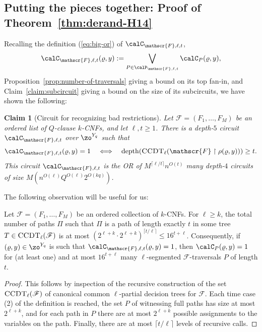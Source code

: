\documentclass[11pt]{article}
\numberwithin{equation}{section}
\newtheorem{claim}[theorem]{Claim}
\theoremstyle{definition}
\theoremstyle{plain}
\theoremstyle{plain}
\newcommand{\uhr}{\upharpoonright}
\newcommand{\CCDT}{\textsc{CCDT}}
\newcommand{\depth}{\mathrm{depth}}
\begin{document}
\subsection{Putting the pieces together: Proof of Theorem~\ref{thm:derand-H14}}

Recalling the definition (\ref{eq:big-or}) of $\calC_{\mathscr{F},\ell,t}$, 
\[ \calC_{\mathscr{F},\ell,t}(\varrho,y) := \bigvee_{P\in\calP_{\mathscr{F},\ell,t}} \calC_P(\varrho,y), \] 
Proposition~\ref{prop:number-of-traversals} giving a bound on its top fan-in, and Claim~\ref{claim:subcircuit} giving a bound on the size of its subcircuits, we have shown the following: 

\begin{claim}[Circuit for recognizing bad restrictions]
\label{claim:overall-ckt}  
Let $\mathscr{F} = (F_1,\ldots,F_M)$ be an ordered list of $Q$-clause $k$-CNFs, and let $\ell,t\ge 1$.  There is a depth-$5$ circuit $\calC_{\mathscr{F},\ell,t}$ over $\zo^{Y_q}$ such that 
\[ \calC_{\mathscr{F},\ell,t}(\varrho,y) = 1 \quad \Longleftrightarrow \quad \depth(\CCDT_\ell(\mathscr{F} \uhr \rho(\varrho,y))) \ge t. \] 
This circuit $\calC_{\mathscr{F},\ell,t}$ is the OR of $M^{\lceil \ell/t\rceil} n^{O(t)}$ many depth-$4$ circuits of size $M(n^{O(\ell)}Q^{O(\ell)}2^{O(kq)})$. 
\end{claim} 




The following observation will be useful for us: 

\begin{observation}
\label{obs:few-sat} 
Let $\mathscr{F} = (F_1,\ldots,F_M)$ be an ordered collection of $k$-CNFs.  For $\ell \geq k$, the total number of paths $\Pi$ such that $\Pi$ is a path of length exactly $t$ in some tree $T \in \CCDT_\ell(\mathscr{F})$ is at most $(2^{\ell+k} \cdot 2^{\ell + k})^{\lceil t/\ell\rceil} \le 16^{t+\ell}$. 
Consequently, if $(\varrho,y)\in \zo^{Y_q}$ is such that $\calC_{\mathscr{F},\ell,t}(\varrho,y) = 1$, then $\calC_P(\varrho,y) =1$ for (at least one) and at most $16^{t+\ell}$ many $\ell$-segmented $\mathscr{F}$-traversals $P$ of length $t$. 
\end{observation}

\begin{proof}
This follows by inspection of the recursive construction of the set $\CCDT_\ell(\mathscr{F})$ of canonical common $\ell$-partial decision trees for $\mathscr{F}$.  Each time case (2) of the definition is reached, the set $P$ of witnessing full paths has size at most $2^{\ell + k}$, and for each path in $P$ there are at most $2^{\ell + k}$ possible assignments to the variables on the path.  Finally, there are at most $\lceil t/\ell \rceil$ levels of recursive calls. 
\end{proof} 
\end{document}
